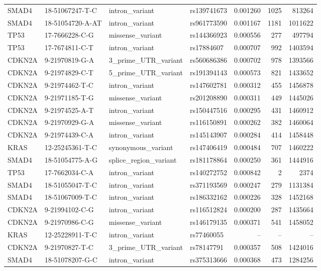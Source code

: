\begin{footnotesize}
\begin{longtable}{llllrrr}
SMAD4 & 18-51067247-T-C & intron\_variant & rs139741673 & 0.001260 & 1025 & 813264 \\
SMAD4 & 18-51054720-A-AT & intron\_variant & rs961773590 & 0.001167 & 1181 & 1011622 \\
TP53 & 17-7666228-C-G & missense\_variant & rs144366923 & 0.000556 & 277 & 497794 \\
TP53 & 17-7674811-C-T & intron\_variant & rs17884607 & 0.000707 & 992 & 1403594 \\
CDKN2A & 9-21970819-G-A & 3\_prime\_UTR\_variant & rs560686386 & 0.000702 & 978 & 1393566 \\
CDKN2A & 9-21974829-C-T & 5\_prime\_UTR\_variant & rs191394143 & 0.000573 & 821 & 1433652 \\
CDKN2A & 9-21974462-T-C & intron\_variant & rs147602781 & 0.000312 & 455 & 1456878 \\
CDKN2A & 9-21971185-T-G & missense\_variant & rs201208890 & 0.000311 & 449 & 1445026 \\
CDKN2A & 9-21974525-A-T & intron\_variant & rs150447516 & 0.000295 & 431 & 1460912 \\
CDKN2A & 9-21970929-G-A & missense\_variant & rs116150891 & 0.000262 & 382 & 1460064 \\
CDKN2A & 9-21974439-C-A & intron\_variant & rs145143907 & 0.000284 & 414 & 1458448 \\
KRAS & 12-25245361-T-C & synonymous\_variant & rs147406419 & 0.000484 & 707 & 1460222 \\
SMAD4 & 18-51054775-A-G & splice\_region\_variant & rs181178864 & 0.000250 & 361 & 1444916 \\
TP53 & 17-7662034-C-A & intron\_variant & rs140272752 & 0.000842 & 2 & 2374 \\
SMAD4 & 18-51055047-T-C & intron\_variant & rs371193569 & 0.000247 & 279 & 1131384 \\
SMAD4 & 18-51067009-T-C & intron\_variant & rs186332162 & 0.000226 & 328 & 1452168 \\
CDKN2A & 9-21994102-C-G & intron\_variant & rs116512824 & 0.000200 & 287 & 1435664 \\
CDKN2A & 9-21970986-C-G & missense\_variant & rs146179135 & 0.000371 & 541 & 1458052 \\
KRAS & 12-25228911-T-C & intron\_variant & rs77460055 & -- & -- & -- \\
CDKN2A & 9-21970827-T-C & 3\_prime\_UTR\_variant & rs78147791 & 0.000357 & 508 & 1424016 \\
SMAD4 & 18-51078207-G-C & intron\_variant & rs375313666 & 0.000368 & 473 & 1284256 \\

\end{longtable}
\end{footnotesize}
